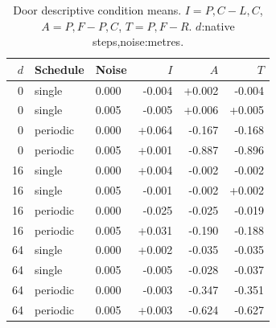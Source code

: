 \documentclass[10pt,a4paper]{article}
\begin{document}
\renewcommand{\thetable}{S\arabic{table}}
\setcounter{table}{2}
\begin{table}[H]\centering\small
\caption{Door descriptive condition means. $I=P,C-L,C$, $A=P,F-P,C$, $T=P,F-R$. $d$:native steps,noise:metres.}
\begin{tabular}{rllrrr}
\toprule $d$ & Schedule & Noise & $I$ & $A$ & $T$\\\midrule
0 & single & 0.000 & -0.004 & +0.002 & -0.004\\
0 & single & 0.005 & -0.005 & +0.006 & +0.005\\
0 & periodic & 0.000 & +0.064 & -0.167 & -0.168\\
0 & periodic & 0.005 & +0.001 & -0.887 & -0.896\\
16 & single & 0.000 & +0.004 & -0.002 & -0.002\\
16 & single & 0.005 & -0.001 & -0.002 & +0.002\\
16 & periodic & 0.000 & -0.025 & -0.025 & -0.019\\
16 & periodic & 0.005 & +0.031 & -0.190 & -0.188\\
64 & single & 0.000 & +0.002 & -0.035 & -0.035\\
64 & single & 0.005 & -0.005 & -0.028 & -0.037\\
64 & periodic & 0.000 & -0.003 & -0.347 & -0.351\\
64 & periodic & 0.005 & +0.003 & -0.624 & -0.627\\
\bottomrule\end{tabular}\end{table}
\end{document}
